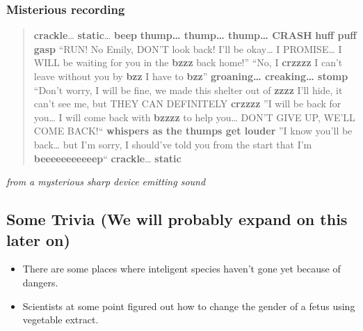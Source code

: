 \documentclass[11pt]{article}
\begin{document}
\subsubsection*{Misterious recording}
\label{sec:org144e1e1}
\begin{quote}
\textbf{crackle}\ldots{} \textbf{static}\ldots{} \textbf{beep}
\textbf{thump\ldots{} thump\ldots{} thump\ldots{} CRASH}
\textbf{huff puff gasp}
``RUN! No Emily, DON'T look back! I'll be okay\ldots{} I PROMISE\ldots{} I WILL be waiting for you in the \textbf{bzzz} back home!''
``No, I \textbf{crzzzz} I can't leave without you by \textbf{bzz} I have to \textbf{bzz}''
\textbf{groaning\ldots{} creaking\ldots{} stomp}
``Don't worry, I will be fine, we made this shelter out of \textbf{zzzz} I'll hide, it can't see me, but THEY CAN DEFINITELY \textbf{crzzzz}
''I will be back for you\ldots{} I will come back with \textbf{bzzzz} to help you\ldots{} DON'T GIVE UP, WE'LL COME BACK!``
\textbf{whispers as the thumps get louder}
''I know you'll be back\ldots{} but I'm sorry, I should've told you from the start that I'm \textbf{beeeeeeeeeeep}``
\textbf{crackle}\ldots{} \textbf{static}
\end{quote}
\emph{from a mysterious sharp device emitting sound}

\subsection*{Some Trivia (We will probably expand on this later on)}
\label{sec:orgbd53c91}
\begin{itemize}
\item There are some places where inteligent species haven't gone yet because of dangers.
\item Scientists at some point figured out how to change the gender of a fetus using vegetable extract.
\end{itemize}
\end{document}
